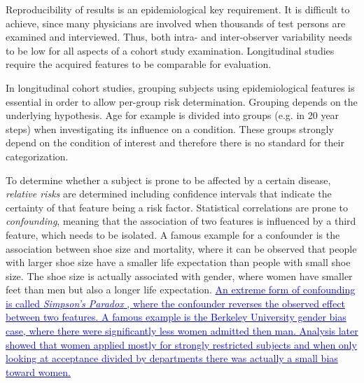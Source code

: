 \documentclass[journal]{style/vgtc} 			          %
\newcommand{\add}[1]{\textcolor{blue}{\uline{#1}}}
\begin{document}
Reproducibility of results is an epidemiological key requirement.
%
It is difficult to achieve, since many physicians are involved when thousands of test persons are examined and interviewed.
%
Thus, both intra- and inter-observer variability needs to be low for all aspects of a cohort study examination.
%
Longitudinal studies require the acquired features to be comparable for evaluation.
%
%

In longitudinal cohort studies, grouping subjects using epidemiological features is essential in order to allow per-group risk determination.
%
Grouping depends on the underlying hypothesis.
%
Age for example is divided into groups (e.g. in 20 year steps) when investigating its influence on a condition.
%
These groups strongly depend on the condition of interest and therefore there is no standard for their categorization.

%
To determine whether a subject is prone to be affected by a certain disease, \emph{relative risks} are determined including confidence intervals that indicate the certainty of that feature being a risk factor.
%
Statistical correlations are prone to \emph{confounding}, meaning that the association of two features is influenced by a third feature, which needs to be isolated.
%
A famous example for a confounder is the association between shoe size and mortality, where it can be observed that people with larger shoe size have a smaller life expectation than people with small shoe size.
%
The shoe size is actually associated with gender, where women have smaller feet than men but also a longer life expectation.
%
\add{An extreme form of confounding is called \emph{Simpson's Paradox} \cite{SimpsonsParadox}, where the confounder reverses the observed effect between two features.
%
A famous example is the Berkeley University gender bias case, where there were significantly less women admitted then man.
%
Analysis later showed that women applied mostly for strongly restricted subjects and when only looking at acceptance divided by departments there was actually a small bias toward women.
%
}
\end{document}
